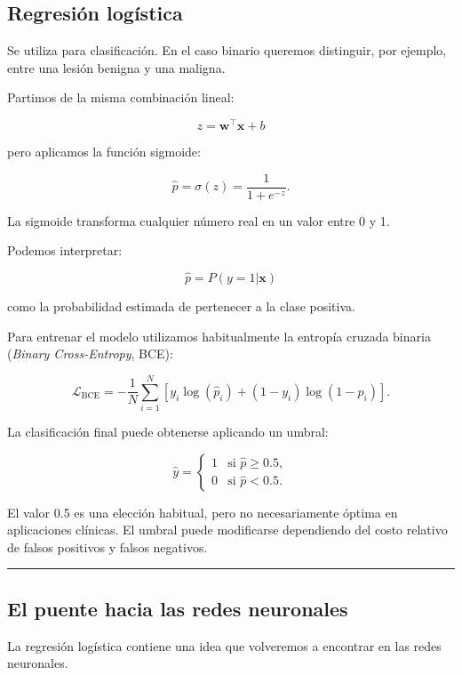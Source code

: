 \documentclass[
  letterpaper,
  DIV=11,
  numbers=noendperiod]{scrartcl}
\begin{document}
\subsection{Regresión logística}\label{regresiuxf3n-loguxedstica}

Se utiliza para clasificación. En el caso binario queremos distinguir,
por ejemplo, entre una lesión benigna y una maligna.

Partimos de la misma combinación lineal:

\[
z=\mathbf{w}^{\top}\mathbf{x}+b
\]

pero aplicamos la función sigmoide:

\[
\hat p
=
\sigma(z)
=
\frac{1}{1+e^{-z}}.
\]

La sigmoide transforma cualquier número real en un valor entre 0 y 1.

Podemos interpretar:

\[
\hat p=P(y=1|\mathbf{x})
\]

como la probabilidad estimada de pertenecer a la clase positiva.

Para entrenar el modelo utilizamos habitualmente la entropía cruzada
binaria (\emph{Binary Cross-Entropy}, BCE):

\[
\mathcal{L}_{\mathrm{BCE}}
=
-\frac{1}{N}
\sum_{i=1}^{N}
\left[
y_i\log(\hat p_i)
+
(1-y_i)\log(1-\hat p_i)
\right].
\]

La clasificación final puede obtenerse aplicando un umbral:

\[
\hat y=
\begin{cases}
1 & \text{si } \hat p\geq 0.5,\\
0 & \text{si } \hat p<0.5.
\end{cases}
\]

El valor 0.5 es una elección habitual, pero no necesariamente óptima en
aplicaciones clínicas. El umbral puede modificarse dependiendo del costo
relativo de falsos positivos y falsos negativos.

\begin{center}\rule{0.5\linewidth}{0.5pt}\end{center}

\subsection{El puente hacia las redes
neuronales}\label{el-puente-hacia-las-redes-neuronales}

La regresión logística contiene una idea que volveremos a encontrar en
las redes neuronales.
\end{document}
